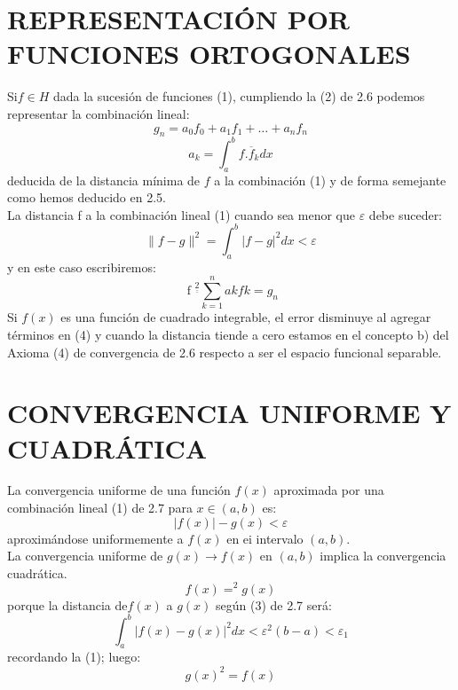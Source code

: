 \section{REPRESENTACIÓN POR FUNCIONES ORTOGONALES}

Si$  f \in H $ dada la sucesión de funciones (1), cumpliendo la (2) de 2.6 podemos
representar la combinación lineal:
\setcounter{equation}{0}%
\begin{equation}
g_{n} = a_{0}f_{0}+a_{1}f_{1}+\ldots+a_{n}f_{n}
\end{equation}
\begin{equation}
a_{k} = \int_{a}^{b}f.\overline{f}_{k}dx
\end{equation}
deducida de la distancia mínima de $ f $ a la combinación (1) y de forma semejante como hemos deducido en 2.5.\\
La distancia f a la combinación lineal (1) cuando sea menor que \underline{\underline{$\varepsilon$}} debe suceder:
\begin{equation}
\parallel f - g \parallel ^{2} = \int_{a}^{b} |f - g|^{2}dx < \varepsilon
\end{equation}
y en este caso escribiremos:
\begin{equation}
\text{  f   }  ^{\underline{\underline{2}}} \sum_{k = 1}^{n} akfk = g_{n}
\end{equation}
Si $ f(x) $ es una función de cuadrado integrable, el error disminuye al agregar términos en (4) y cuando la distancia tiende a cero estamos en el concepto b) del Axioma (4) de convergencia de 2.6 respecto a ser el espacio funcional separable.

\section{CONVERGENCIA UNIFORME Y CUADRÁTICA}

La convergencia uniforme de una función $ f(x) $ aproximada por una combinación lineal (1) de 2.7 para $ x \in (a, b) $ es:
\setcounter{equation}{0}%
\begin{equation}
		|f(x)| - g(x)  < \varepsilon
\end{equation}
aproximándose uniformemente a $ f(x) $ en ei intervalo $ (a, b) $.\\
La convergencia uniforme de  $ g(x) \rightarrow f(x) $ en $ (a, b) $ implica la convergencia  cuadrática.\\
\begin{equation}
f(x)  =^{2} g(x) 
\end{equation}
porque la distancia de$f(x)$ a $g(x)$ según (3) de 2.7 será:
\begin{equation}
\int_{a}^{b}|f(x)-g(x)|^{2}dx < \varepsilon^{2}(b-a) < \varepsilon_{1}
\end{equation}
recordando la (1); luego:
\begin{equation}
g(x)^{2} = f(x)
\end{equation}
